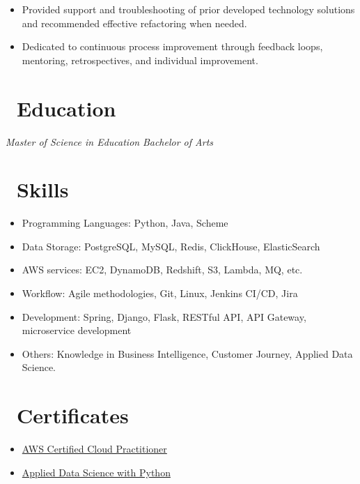 \documentclass{resume}
\begin{document}
\begin{itemize}
  \item Provided support and troubleshooting of prior developed technology solutions and recommended effective refactoring when needed. 
  \item Dedicated to continuous process improvement through feedback loops, mentoring, retrospectives, and individual improvement.
\end{itemize}


\section{\faGraduationCap\ Education}
\textit{Master of Science in Education}
\textit{Bachelor of Arts}

\section{\faCogs\ Skills}
\begin{itemize}[parsep=0.5ex]
  \item Programming Languages: Python, Java, Scheme
  \item Data Storage: PostgreSQL, MySQL, Redis, ClickHouse, ElasticSearch
  \item AWS services: EC2, DynamoDB, Redshift, S3, Lambda, MQ, etc.
  \item Workflow: Agile methodologies, Git, Linux, Jenkins CI/CD, Jira
  \item Development: Spring, Django, Flask, RESTful API, API Gateway, microservice development
  \item Others: Knowledge in Business Intelligence, Customer Journey, Applied Data Science.
\end{itemize}

\section{\faCertificate\ Certificates}
\begin{itemize}[parsep=0.5ex]
  \item \href {https://www.credly.com/badges/04007dd2-558b-42d7-8488-219e9a4b9fba/linked_in?t=s0vfeo}{AWS Certified Cloud Practitioner}
  \item \href {https://www.coursera.org/account/accomplishments/specialization/certificate/RXJBLCB4SV9F}{Applied Data Science with Python}
\end{itemize}
\end{document}
